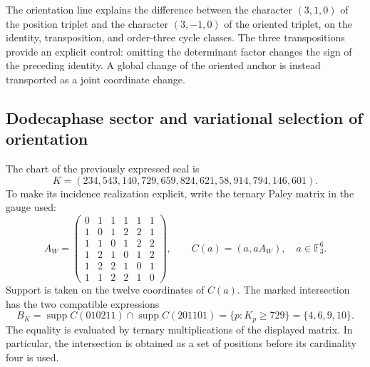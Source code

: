 The orientation line explains the difference between the character
\((3,1,0)\) of the position triplet and the character \((3,-1,0)\)
of the oriented triplet, on the identity, transposition, and
order-three cycle classes. The three transpositions provide an explicit control:
omitting the determinant factor changes the sign of the preceding identity.
A global change of the oriented anchor is instead transported as a joint
coordinate change.

\subsection{Dodecaphase sector and variational selection of orientation}

The chart of the previously expressed seal is
\begin{equation}
 K=(234,543,140,729,659,824,621,58,914,794,146,601).
 \label{eq:ii-witt-K-marked}
\end{equation}
To make its incidence realization explicit, write the ternary Paley
matrix in the gauge used:
\[
 A_W=\begin{pmatrix}
 0&1&1&1&1&1\\
 1&0&1&2&2&1\\
 1&1&0&1&2&2\\
 1&2&1&0&1&2\\
 1&2&2&1&0&1\\
 1&1&2&2&1&0
 \end{pmatrix},
 \qquad C(a)=(a,aA_W),\quad a\in\mathbb F_3^6.
\]
Support is taken on the twelve coordinates of \(C(a)\). The
marked intersection has the two compatible expressions
\begin{equation}
 B_K=\operatorname{supp}C(010211)\cap\operatorname{supp}C(201101)
     =\{p:K_p\ge729\}=\{4,6,9,10\}.
 \label{eq:ii-witt-B-marked}
\end{equation}
The equality is evaluated by ternary multiplications of the displayed
matrix. In particular, the intersection is obtained as a set of
positions before its cardinality four is used.


